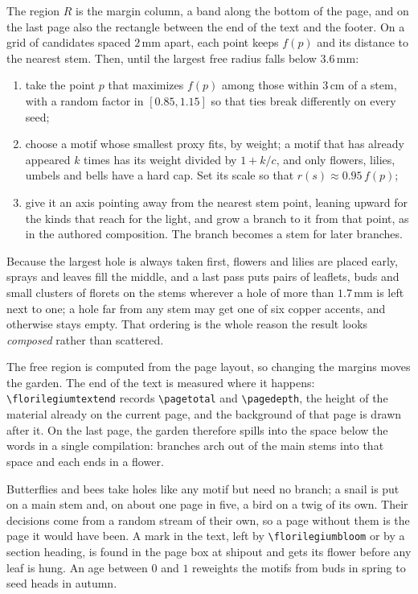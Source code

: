 \begin{construction}[Growth]
The region $R$ is the margin column, a band along the bottom of the page, and on the last
page also the rectangle between the end of the text and the footer. On a grid of candidates
spaced $2\,$mm apart, each point keeps $f(p)$ and its distance to the nearest stem. Then,
until the largest free radius falls below $3.6\,$mm:
\begin{enumerate}
  \item take the point $p$ that maximizes $f(p)$ among those within $3\,$cm of a stem, with
        a random factor in $[0.85,1.15]$ so that ties break differently on every seed;
  \item choose a motif whose smallest proxy fits, by weight; a motif that has already
        appeared $k$ times has its weight divided by $1+k/c$, and only flowers, lilies,
        umbels and bells have a hard cap. Set its scale so that $r(s)\approx0.95\,f(p)$;
  \item give it an axis pointing away from the nearest stem point, leaning upward for the
        kinds that reach for the light, and grow a branch to it from that point, as in the
        authored composition. The branch becomes a stem for later branches.
\end{enumerate}
Because the largest hole is always taken first, flowers and lilies are placed early,
sprays and leaves fill the middle, and a last pass puts pairs of leaflets, buds and small
clusters of florets on the stems wherever a hole of more than $1.7\,$mm is left next to
one; a hole far from any stem may get one of six copper accents, and otherwise stays empty.
That ordering is the whole reason the result looks \emph{composed} rather than scattered.
\end{construction}

\begin{remark}
The free region is computed from the page layout, so changing the margins moves the
garden. The end of the text is measured where it happens: \verb|\florilegiumtextend|
records \verb|\pagetotal| and \verb|\pagedepth|, the height of the material already on the
current page, and the background of that page is drawn after it. On the last page, the
garden therefore spills into the space below the words in a single compilation: branches
arch out of the main stems into that space and each ends in a flower.
\end{remark}

\begin{remark}
Butterflies and bees take holes like any motif but need no branch; a snail is put on a
main stem and, on about one page in five, a bird on a twig of its own. Their decisions come
from a random stream of their own, so a page without them is the page it would have been.
A mark in the text, left by \verb|\florilegiumbloom| or by a section heading, is found in
the page box at shipout and gets its flower before any leaf is hung. An age between $0$
and $1$ reweights the motifs from buds in spring to seed heads in autumn.
\end{remark}

